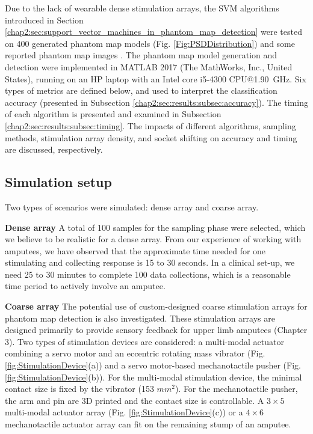 Due to the lack of wearable dense stimulation arrays, the SVM algorithms introduced in Section \ref{chap2:sec:support_vector_machines_in_phantom_map_detection} were tested on 400 generated phantom map models (Fig. \ref{Fig:PSDDistribution}) and some reported phantom map images \cite{antfolk2012sensory, chai2015characterization,bjorkman2016sensory}.
The phantom map model generation and detection were implemented in MATLAB 2017 (The MathWorks, Inc., United States), running on an HP laptop with an Intel core i5-4300 CPU@\SI{1.90}{GHz}.
Six types of metrics are defined below, and used to interpret the classification accuracy (presented in Subsection \ref{chap2:sec:results:subsec:accuracy}). The timing of each algorithm is presented and examined in Subsection \ref{chap2:sec:results:subsec:timing}. 
The impacts of different algorithms, sampling methods, stimulation array density, and socket shifting on accuracy and timing are discussed, respectively.


\subsection{Simulation setup}
Two types of scenarios were simulated: dense array and coarse array.

\textbf{Dense array} 
A total of 100 samples for the sampling phase were selected, which we believe to be realistic for a dense array.
From our experience of working with amputees, we have observed that the approximate time needed for one stimulating and collecting response is 15 to 30 seconds. In a clinical set-up, we need 25 to 30 minutes to complete 100 data collections, which is a reasonable time period to actively involve an amputee. 

\textbf{Coarse array} 
The potential use of custom-designed coarse stimulation arrays for phantom map detection is also investigated. These stimulation arrays are designed primarily to provide sensory feedback for upper limb amputees (Chapter 3). Two types of stimulation devices are considered: a multi-modal actuator combining a servo motor and an eccentric rotating mass vibrator (Fig. \ref{fig:StimulationDevice}(a)) and a servo motor-based mechanotactile pusher (Fig. \ref{fig:StimulationDevice}(b)).  For the multi-modal stimulation device, the minimal contact size is fixed by the vibrator (153 $mm^2$).  For the mechanotactile pusher,  the arm and pin are 3D printed and the contact size is controllable.  A $3 \times 5$ multi-modal actuator array (Fig. \ref{fig:StimulationDevice}(c)) \cite{li2016miniature} or a $4 \times 6$ mechanotactile actuator array can fit on the remaining stump of an amputee.


